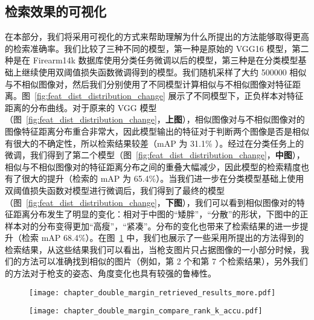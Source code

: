 \subsection{检索效果的可视化}
在本部分，我们将采用可视化的方式来帮助理解为什么所提出的方法能够取得更高的检索准确率。我们比较了三种不同的模型，第一种是原始的 VGG16 模型，第二种是在 Firearm14k 数据库使用分类任务微调以后的模型，第三种是在分类模型基础上继续使用双阈值损失函数微调得到的模型。我们随机采样了大约 500000 相似与不相似图像对，然后我们分别使用了不同模型计算相似与不相似图像对特征距离。图~\ref{fig:feat_dist_distribution_change} 展示了不同模型下，正负样本对特征距离的分布曲线。对于原来的 VGG 模型（图~\ref{fig:feat_dist_distribution_change}，\textbf{上图}），相似图像对与不相似图像对的图像特征距离分布重合非常大，因此模型输出的特征对于判断两个图像是否是相似有很大的不确定性，所以检索结果较差（mAP 为 31.1\% ）。经过在分类任务上的微调，我们得到了第二个模型（图~\ref{fig:feat_dist_distribution_change}，\textbf{中图}），相似与不相似图像对的特征距离分布之间的重叠大幅减少，因此模型的检索精度也有了很大的提升（检索的 mAP 为 65.4\%）。当我们进一步在分类模型基础上使用双阈值损失函数对模型进行微调后，我们得到了最终的模型（图~\ref{fig:feat_dist_distribution_change}，\textbf{下图}），我们可以看到相似图像对的特征距离分布发生了明显的变化：相对于中图的“矮胖”，“分散”的形状，下图中的正样本对的分布变得更加“高瘦”，“紧凑”。分布的变化也带来了检索结果的进一步提升（检索 mAP 68.4\%）。在图~\ref{fig:double_margin_retrieval_result} 中，我们也展示了一些采用所提出的方法得到的检索结果，从这些结果我们可以看出，当枪支图片只占据图像的一小部分时候，我们的方法可以准确找到相似的图片（例如，第 2 个和第 7 个检索结果），另外我们的方法对于枪支的姿态、角度变化也具有较强的鲁棒性。

\begin{figure}[t]
	\centering
	\texttt{[image: chapter\_double\_margin\_retrieved\_results\_more.pdf]}
	\label{fig:double_margin_retrieval_result}
\end{figure}


\begin{figure}[t]
	\centering
	\texttt{[image: chapter\_double\_margin\_compare\_rank\_k\_accu.pdf]}
	\label{fig:rank_k_accuracy_compare}
\end{figure}

